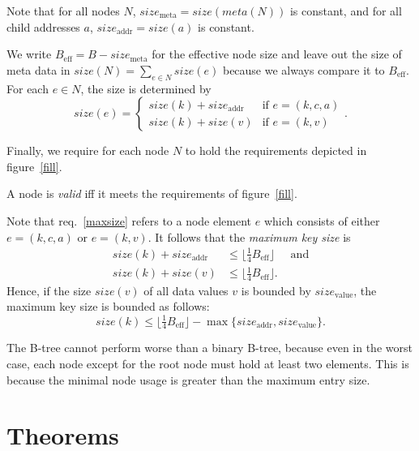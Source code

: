 \documentclass{vldb}
\newcommand \Beff { B_{\text{eff}} }
\begin{document}
\begin{defi}
Note that for all nodes $N$, $size_\text{meta} = size(meta(N))$ is constant,
and for all child addresses $a$, $size_\text{addr} = size(a)$ is constant.

We write $\Beff = B - size_\text{meta}$ for the effective node size and leave
out the size of meta data in $size(N) = \sum_{e \in N} size(e)$ because we
always compare it to $\Beff$.
For each $e \in N$, the size is determined by
\[ size(e) = \begin{cases}
size(k) + size_\text{addr} & \text{if } e = (k,c,a)\\
size(k) + size(v)          & \text{if } e = (k,v)
\end{cases}. \]

Finally, we require for each node $N$ to hold the requirements depicted in
figure~\ref{fill}.
\end{defi}


\begin{defi}
A node is {\em valid} iff it meets the requirements of figure~\ref{fill}.
\end{defi}


\begin{rem}
Note that req.~\ref{maxsize} refers to a node element $e$ which consists
of either \mbox{$e = (k, c, a)$} or \mbox{$e = (k, v)$}.
It follows that the {\em maximum key size} is
\begin{align*}
size(k) + size_\text{addr}
    &\leq \lfloor \tfrac{1}{4} \Beff \rfloor & \text{ and}\\
size(k) + size(v)
    &\leq \lfloor \tfrac{1}{4} \Beff \rfloor.
\end{align*}
Hence, if the size $size(v)$ of all data values $v$ is bounded by
$size_\text{value}$, the maximum key size is bounded as follows:
\[ size(k) \leq \lfloor \tfrac{1}{4} \Beff \rfloor 
    - \max \{ size_\text{addr}, size_\text{value} \}. \]
\end{rem}


\begin{rem}
The B-tree cannot perform worse than a binary B-tree, because even in the worst
case, each node except for the root node must hold at least two elements.
This is because the minimal node usage is greater than the maximum entry size.
\end{rem}



\section{Theorems} %
\end{document}

